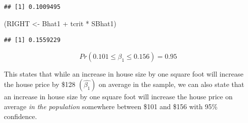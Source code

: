 \documentclass[
]{book}
\newenvironment{Shaded}{\begin{snugshade}}{\end{snugshade}}
\newcommand{\AttributeTok}[1]{\textcolor[rgb]{0.77,0.63,0.00}{#1}}
\newcommand{\CommentTok}[1]{\textcolor[rgb]{0.56,0.35,0.01}{\textit{#1}}}
\newcommand{\ConstantTok}[1]{\textcolor[rgb]{0.00,0.00,0.00}{#1}}
\newcommand{\DecValTok}[1]{\textcolor[rgb]{0.00,0.00,0.81}{#1}}
\newcommand{\FloatTok}[1]{\textcolor[rgb]{0.00,0.00,0.81}{#1}}
\newcommand{\FunctionTok}[1]{\textcolor[rgb]{0.00,0.00,0.00}{#1}}
\newcommand{\NormalTok}[1]{#1}
\newcommand{\OtherTok}[1]{\textcolor[rgb]{0.56,0.35,0.01}{#1}}
\newcommand{\SpecialCharTok}[1]{\textcolor[rgb]{0.00,0.00,0.00}{#1}}
\begin{document}
\begin{Shaded}
\end{Shaded}

\begin{verbatim}
## [1] 0.1009495
\end{verbatim}

\begin{Shaded}
\begin{Highlighting}[]
\NormalTok{(RIGHT }\OtherTok{\textless{}{-}}\NormalTok{ Bhat1 }\SpecialCharTok{+}\NormalTok{ tcrit }\SpecialCharTok{*}\NormalTok{ SBhat1)}
\end{Highlighting}
\end{Shaded}

\begin{verbatim}
## [1] 0.1559229
\end{verbatim}

\[Pr(0.101 \leq \beta_1 \leq 0.156)=0.95\]

This states that while an increase in house size by one square foot will increase the house price by \$128 \((\hat{\beta_1})\) on average in the sample, we can also state that an increase in house size by one square foot will increase the house price on average \emph{in the population} somewhere between \$101 and \$156 with 95\% confidence.
\end{document}
